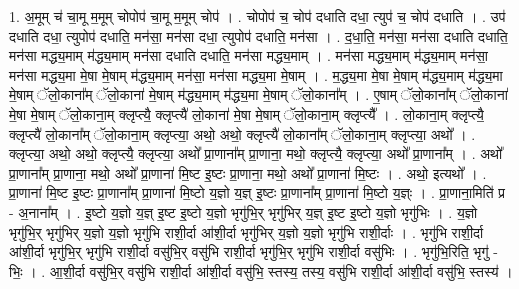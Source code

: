 \documentclass[17pt]{extarticle}
\begin{document}
1. अ॒मूम् च॑ चा॒मू म॒मूम् चोपोप॑ चा॒मू म॒मूम् चोप॑ । . चोपोप॑ च॒ चोप॑ दधाति दधा॒ त्युप॑ च॒ चोप॑ दधाति । . उप॑ दधाति दधा॒ त्युपोप॑ दधाति॒ मन॑सा॒ मन॑सा दधा॒ त्युपोप॑ दधाति॒ मन॑सा । . द॒धा॒ति॒ मन॑सा॒ मन॑सा दधाति दधाति॒ मन॑सा मद्ध्य॒माम् म॑द्ध्य॒माम् मन॑सा दधाति दधाति॒ मन॑सा मद्ध्य॒माम् । . मन॑सा मद्ध्य॒माम् म॑द्ध्य॒माम् मन॑सा॒ मन॑सा मद्ध्य॒मा मे॒षा मे॒षाम् म॑द्ध्य॒माम् मन॑सा॒ मन॑सा मद्ध्य॒मा मे॒षाम् । . म॒द्ध्य॒मा मे॒षा मे॒षाम् म॑द्ध्य॒माम् म॑द्ध्य॒मा मे॒षाम् ॅलो॒काना᳚म् ॅलो॒काना॑ मे॒षाम् म॑द्ध्य॒माम् म॑द्ध्य॒मा मे॒षाम् ॅलो॒काना᳚म् । . ए॒षाम् ॅलो॒काना᳚म् ॅलो॒काना॑ मे॒षा मे॒षाम् ॅलो॒काना॒म् क्लृप्त्यै॒ क्लृप्त्यै॑ लो॒काना॑ मे॒षा मे॒षाम् ॅलो॒काना॒म् क्लृप्त्यै᳚ । . लो॒काना॒म् क्लृप्त्यै॒ क्लृप्त्यै॑ लो॒काना᳚म् ॅलो॒काना॒म् क्लृप्त्या॒ अथो॒ अथो॒ क्लृप्त्यै॑ लो॒काना᳚म् ॅलो॒काना॒म् क्लृप्त्या॒ अथो᳚ । . क्लृप्त्या॒ अथो॒ अथो॒ क्लृप्त्यै॒ क्लृप्त्या॒ अथो᳚ प्रा॒णाना᳚म् प्रा॒णाना॒ मथो॒ क्लृप्त्यै॒ क्लृप्त्या॒ अथो᳚ प्रा॒णाना᳚म् । . अथो᳚ प्रा॒णाना᳚म् प्रा॒णाना॒ मथो॒ अथो᳚ प्रा॒णाना॑ मि॒ष्ट इ॒ष्टः प्रा॒णाना॒ मथो॒ अथो᳚ प्रा॒णाना॑ मि॒ष्टः । . अथो॒ इत्यथो᳚ । . प्रा॒णाना॑ मि॒ष्ट इ॒ष्टः प्रा॒णाना᳚म् प्रा॒णाना॑ मि॒ष्टो य॒ज्ञो य॒ज्ञ् इ॒ष्टः प्रा॒णाना᳚म् प्रा॒णाना॑ मि॒ष्टो य॒ज्ञ्ः । . प्रा॒णाना॒मिति॑ प्र - अ॒नाना᳚म् । . इ॒ष्टो य॒ज्ञो य॒ज्ञ् इ॒ष्ट इ॒ष्टो य॒ज्ञो भृगु॑भि॒र् भृगु॑भिर् य॒ज्ञ् इ॒ष्ट इ॒ष्टो य॒ज्ञो भृगु॑भिः । . य॒ज्ञो भृगु॑भि॒र् भृगु॑भिर् य॒ज्ञो य॒ज्ञो भृगु॑भि राशी॒र्दा आ॑शी॒र्दा भृगु॑भिर् य॒ज्ञो य॒ज्ञो भृगु॑भि राशी॒र्दाः । . भृगु॑भि राशी॒र्दा आ॑शी॒र्दा भृगु॑भि॒र् भृगु॑भि राशी॒र्दा वसु॑भि॒र् वसु॑भि राशी॒र्दा भृगु॑भि॒र् भृगु॑भि राशी॒र्दा वसु॑भिः । . भृगु॑भि॒रिति॒ भृगु॑ - भिः॒ । . आ॒शी॒र्दा वसु॑भि॒र् वसु॑भि राशी॒र्दा आ॑शी॒र्दा वसु॑भि॒ स्तस्य॒ तस्य॒ वसु॑भि राशी॒र्दा आ॑शी॒र्दा वसु॑भि॒ स्तस्य॑ । \newline
\end{document}
